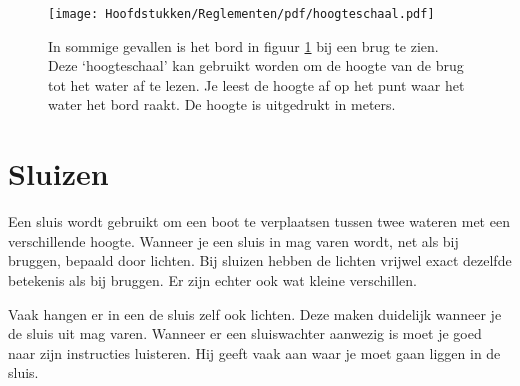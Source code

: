 \vspace{-0.75cm}
\begin{figure}[H]
	\centering
	\begin{minipage}[b]{0.18\textwidth}
		\texttt{[image: Hoofdstukken/Reglementen/pdf/hoogteschaal.pdf]}
		\caption{}
		\label{pic:brug:schaal}
	\end{minipage}
	\hfill
	\begin{minipage}[t]{0.75\textwidth}
		\vspace{-3cm}
		In sommige gevallen is het bord in figuur \ref{pic:brug:schaal} bij een brug te zien. Deze `hoogteschaal' kan gebruikt worden om de hoogte van de brug tot het water af te lezen. Je leest de hoogte af op het punt waar het water het bord raakt. De hoogte is uitgedrukt in meters.
	\end{minipage}
\end{figure}

\section{Sluizen}
Een sluis wordt gebruikt om een boot te verplaatsen tussen twee wateren met een verschillende hoogte. Wanneer je een sluis in mag varen wordt, net als bij bruggen, bepaald door lichten.
Bij sluizen hebben de lichten vrijwel exact dezelfde betekenis als bij bruggen. Er zijn echter ook wat kleine verschillen. 

Vaak hangen er in een de sluis zelf ook lichten. Deze maken duidelijk wanneer je de sluis uit mag varen. Wanneer er een sluiswachter aanwezig is moet je goed naar zijn instructies luisteren. Hij geeft vaak aan waar je moet gaan liggen in de sluis. 

